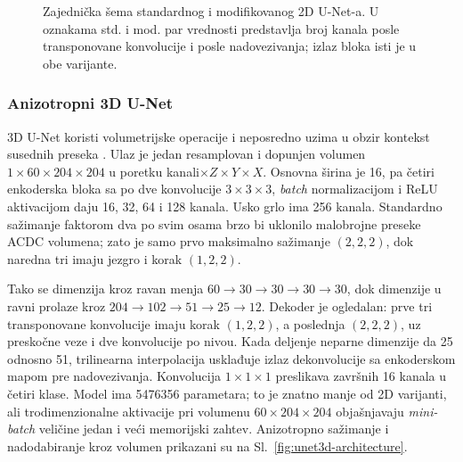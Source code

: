 \documentclass[11pt,a4paper]{article}
\begin{document}
\begin{figure}[H]
{}
	\caption{Zajednička šema standardnog i modifikovanog 2D U-Net-a. U oznakama std. i mod. par vrednosti predstavlja broj kanala posle transponovane konvolucije i posle nadovezivanja; izlaz bloka isti je u obe varijante.}
	\label{fig:unet2d-architecture}
\end{figure}

\subsubsection{Anizotropni 3D U-Net}
3D U-Net koristi volumetrijske operacije i neposredno uzima u obzir kontekst susednih preseka
\cite{cicek2016}. Ulaz je jedan resamplovan i dopunjen volumen $1\times60\times204\times204$ u
poretku kanali$\times Z\times Y\times X$. Osnovna širina je 16, pa četiri enkoderska bloka sa po dve
konvolucije $3\times3\times3$, \textit{batch} normalizacijom i ReLU aktivacijom daju 16, 32, 64 i
128 kanala. Usko grlo ima 256 kanala. Standardno sažimanje faktorom dva po svim osama brzo bi
uklonilo malobrojne preseke ACDC volumena; zato je samo prvo maksimalno sažimanje $(2,2,2)$, dok
naredna tri imaju jezgro i korak $(1,2,2)$.

Tako se dimenzija kroz ravan menja $60\rightarrow30\rightarrow30\rightarrow30\rightarrow30$, dok
dimenzije u ravni prolaze kroz $204\rightarrow102\rightarrow51\rightarrow25\rightarrow12$. Dekoder
je ogledalan: prve tri transponovane konvolucije imaju korak $(1,2,2)$, a poslednja $(2,2,2)$, uz
preskočne veze i dve konvolucije po nivou. Kada deljenje neparne dimenzije da 25 odnosno 51,
trilinearna interpolacija usklađuje izlaz dekonvolucije sa enkoderskom mapom pre nadovezivanja.
Konvolucija $1\times1\times1$ preslikava završnih 16 kanala u četiri klase. Model ima \num{5476356}
parametara; to je znatno manje od 2D varijanti, ali trodimenzionalne aktivacije pri volumenu
$60\times204\times204$ objašnjavaju \textit{mini-batch} veličine jedan i veći memorijski zahtev.
Anizotropno sažimanje i nadodabiranje kroz volumen prikazani su na Sl.~\ref{fig:unet3d-architecture}.
\end{document}

